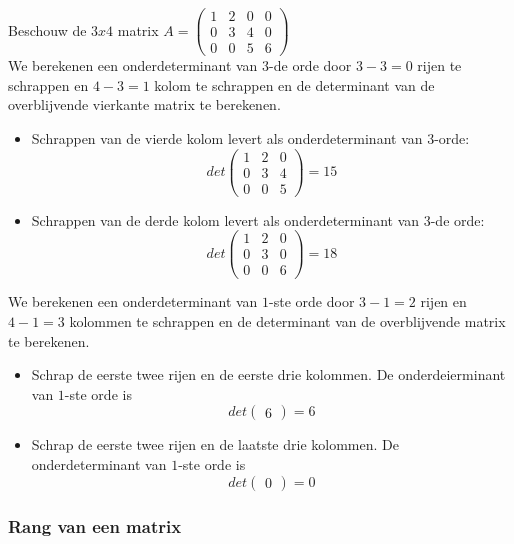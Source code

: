 \begin{voorbeeld}
	

Beschouw de $3x4$ matrix $A= \left( \begin{matrix} 1 & 2 & 0 & 0 \\ 0 & 3 & 4 & 0 \\ 0 & 0 & 5 & 6 \end{matrix} \right)$ \\
We berekenen een onderdeterminant van $3$-de orde door $3-3=0$ rijen te schrappen en $4-3=1$ kolom te schrappen en de determinant van de overblijvende vierkante matrix te berekenen.\\
\begin{itemize}
	\item Schrappen van de vierde kolom levert als onderdeterminant van $3$-orde:
	\[ det \left( \begin{matrix} 1 & 2 & 0 \\ 0 & 3 & 4 \\ 0 & 0 & 5 \end{matrix} \right)=15 \]
	\item Schrappen van de derde kolom levert als onderdeterminant van $3$-de orde:
	\[ det \left( \begin{matrix} 1 & 2 & 0 \\ 0 & 3 & 0 \\ 0 & 0 & 6 \end{matrix} \right)=18 \]
\end{itemize}

We berekenen een onderdeterminant van $1$-ste orde door $3-1=2$ rijen en $4-1=3$ kolommen te schrappen en de determinant van de overblijvende matrix te berekenen.\\
\begin{itemize}
	\item Schrap de eerste twee rijen en de eerste drie kolommen. De onderdeierminant van $1$-ste orde is
	\[  det \left( \begin{matrix} 6 \end{matrix} \right) =6 \]
	\item Schrap de eerste twee rijen en de laatste drie kolommen. De onderdeterminant van $1$-ste orde is
	\[  det \left( \begin{matrix} 0 \end{matrix} \right) =0 \]
\end{itemize}

\end{voorbeeld}
\subsubsection{Rang van een matrix}

